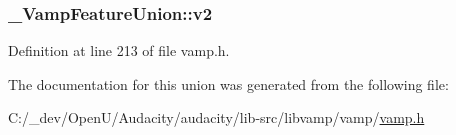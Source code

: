 \subsubsection[{\texorpdfstring{v2}{v2}}]{ \+\_\+\+Vamp\+Feature\+Union\+::v2}\hypertarget{union___vamp_feature_union_a87e508e37e02cce11c3c4ddf087a627a}{}\label{union___vamp_feature_union_a87e508e37e02cce11c3c4ddf087a627a}


Definition at line 213 of file vamp.\+h.



The documentation for this union was generated from the following file\+:\begin{DoxyCompactItemize}
\item 
C\+:/\+\_\+dev/\+Open\+U/\+Audacity/audacity/lib-\/src/libvamp/vamp/\hyperlink{vamp_8h}{vamp.\+h}\end{DoxyCompactItemize}
